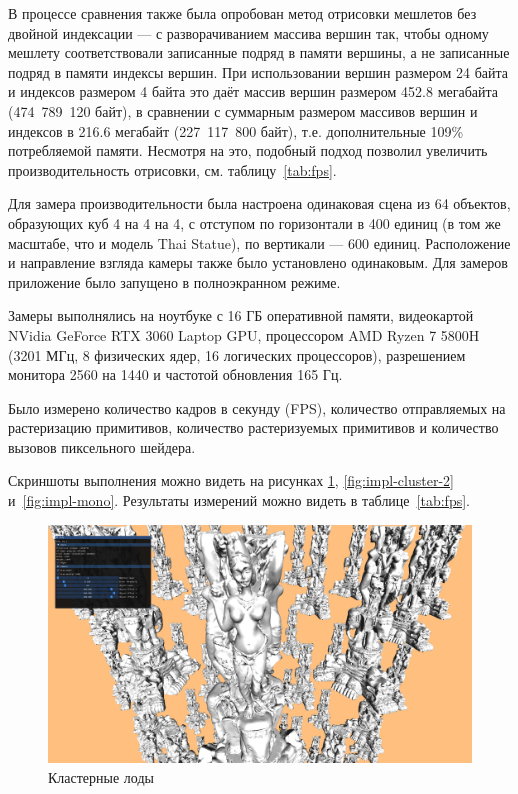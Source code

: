 В процессе сравнения также была опробован метод отрисовки мешлетов без двойной индексации --- с разворачиванием массива вершин так, чтобы одному мешлету соответствовали записанные подряд в памяти вершины, а не записанные подряд в памяти индексы вершин.
При использовании вершин размером 24 байта и индексов размером 4 байта это даёт массив вершин размером 452.8 мегабайта (474~789~120 байт), в сравнении с суммарным размером массивов вершин и индексов в 216.6 мегабайт (227~117~800 байт), т.е. дополнительные 109\% потребляемой памяти.
Несмотря на это, подобный подход позволил увеличить производительность отрисовки, см. таблицу~\ref{tab:fps}.

Для замера производительности была настроена одинаковая сцена из 64 объектов, образующих куб 4 на 4 на 4, с отступом по горизонтали в 400 единиц (в том же масштабе, что и модель Thai Statue), по вертикали --- 600 единиц.
Расположение и направление взгляда камеры также было установлено одинаковым.
Для замеров приложение было запущено в полноэкранном режиме.

Замеры выполнялись на ноутбуке с 16 ГБ оперативной памяти, видеокартой NVidia GeForce RTX 3060 Laptop GPU, процессором AMD Ryzen 7 5800H (3201 МГц, 8 физических ядер, 16 логических процессоров), разрешением монитора 2560 на 1440 и частотой обновления 165 Гц.

Было измерено количество кадров в секунду (FPS), количество отправляемых на растеризацию примитивов, количество растеризуемых примитивов и количество вызовов пиксельного шейдера.

Скриншоты выполнения можно видеть на рисунках \ref{fig:impl-cluster-1}, \ref{fig:impl-cluster-2} и~\ref{fig:impl-mono}.
Результаты измерений можно видеть в таблице~\ref{tab:fps}.

\begin{figure}[h]
    \centering
    \includegraphics[width=\textwidth]{pics/impl1.png}
    \caption{Кластерные лоды}
    \label{fig:impl-cluster-1}
\end{figure}

